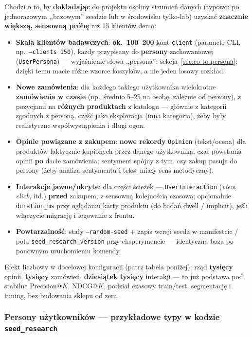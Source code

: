 \documentclass[a4paper,11pt]{article}
\newcommand{\code}[1]{\texttt{\small #1}}
\begin{document}
\noindent Chodzi o to, by \textbf{dokładając} do projektu osobny strumień danych (typowo: po jednorazowym ,,bazowym'' seedzie lub w środowisku tylko-lab) uzyskać \textbf{znacznie większą, sensowną próbę} niż 15 klientów demo:

\begin{itemize}[leftmargin=1.5em,itemsep=3pt]
  \item \textbf{Skala klientów badawczych}: \textbf{ok.\ 100--200} kont \texttt{client} (parametr CLI, np.\ \code{--clients 150}), każdy przypisany do \textbf{persony} zachowaniowej (\code{UserPersona}) --- wyjaśnienie słowa ,,persona'': sekcja~\ref{sec:co-to-persona}; dzięki temu macie różne wzorce koszyków, a nie jeden losowy rozkład.
  \item \textbf{Nowe zamówienia}: dla każdego takiego użytkownika wielokrotne \textbf{zamówienia w czasie} (np.\ średnio 5--25 na osobę, zależnie od persony), z pozycjami na \textbf{różnych produktach} z katalogu --- głównie z kategorii zgodnych z personą, część jako eksploracja (inna kategoria), żeby były realistyczne współwystąpienia i długi ogon.
  \item \textbf{Opinie powiązane z zakupem}: \textbf{nowe rekordy} \code{Opinion} (tekst/ocena) dla produktów faktycznie kupionych przez danego użytkownika; czas powstania opinii \textbf{po} dacie zamówienia; sentyment spójny z tym, czy zakup pasuje do persony (żeby analiza sentymentu i tekst miały sens metodyczny).
  \item \textbf{Interakcje jawne/ukryte}: dla części ścieżek --- \code{UserInteraction} (\emph{view}, \emph{click}, itd.) \textbf{przed} zakupem, z sensowną kolejnością czasową; opcjonalnie \code{duration\_ms} przy oglądaniu karty produktu (do badań dwell / implicit), jeśli włączycie migrację i logowanie z frontu.
  \item \textbf{Powtarzalność}: stały \code{--random-seed} + zapis wersji seeda w manifestcie / polu \code{seed\_research\_version} przy eksperymencie --- identyczna baza po ponownym uruchomieniu komendy.
\end{itemize}

\noindent Efekt liczbowy w docelowej konfiguracji (patrz tabela poniżej): rząd \textbf{tysięcy} opinii, \textbf{tysięcy} zamówień, \textbf{dziesiątek tysięcy} interakji --- to już podstawa pod stabilne Precision@$K$, NDCG@$K$, podział czasowy train/test, segmentację i tuning, bez budowania sklepu od zera.

\subsubsection{Persony użytkowników --- przykładowe typy w kodzie \texttt{seed\_research}}
\end{document}
